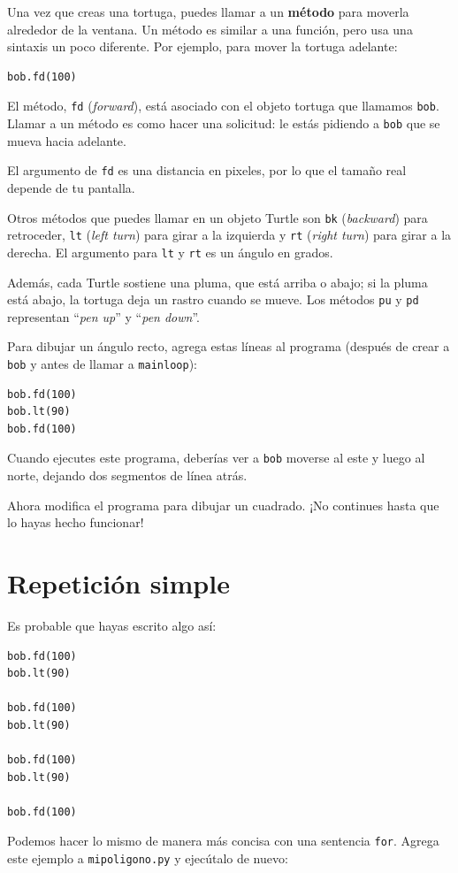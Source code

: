 \documentclass[10pt]{book}
\begin{document}
Una vez que creas una tortuga, puedes llamar a un {\bf método} para moverla
alrededor de la ventana.  Un método es similar a una función, pero
usa una sintaxis un poco diferente.  Por ejemplo, para mover la tortuga
adelante:

\begin{verbatim}
bob.fd(100)
\end{verbatim}
%
El método, {\tt fd} ({\em forward}), está asociado con el objeto
tortuga que llamamos {\tt bob}.
Llamar a un método es como hacer una solicitud: le estás pidiendo a {\tt bob}
que se mueva hacia adelante.

El argumento de {\tt fd} es una distancia en pixeles, por lo que el tamaño
real depende de tu pantalla.

Otros métodos que puedes llamar en un objeto Turtle son {\tt bk} ({\em backward}) para
retroceder, {\tt lt} ({\em left turn}) para girar a la izquierda y {\tt rt} ({\em right turn}) para girar a la derecha.  El
argumento para {\tt lt} y {\tt rt} es un ángulo en grados.

Además, cada Turtle sostiene una pluma, que está
arriba o abajo; si la pluma está abajo, la tortuga deja
un rastro cuando se mueve.  Los métodos {\tt pu} y {\tt pd}
representan ``{\em pen up}'' y ``{\em pen down}''.

Para dibujar un ángulo recto, agrega estas líneas al programa
(después de crear a {\tt bob} y antes de llamar a \verb"mainloop"):

\begin{verbatim}
bob.fd(100)
bob.lt(90)
bob.fd(100)
\end{verbatim}
%
Cuando ejecutes este programa, deberías ver a {\tt bob} moverse al este y luego
al norte, dejando dos segmentos de línea atrás.

Ahora modifica el programa para dibujar un cuadrado.  ¡No continues hasta que
lo hayas hecho funcionar!


\section{Repetición simple}
\label{repetition}

Es probable que hayas escrito algo así:

\begin{verbatim}
bob.fd(100)
bob.lt(90)

bob.fd(100)
bob.lt(90)

bob.fd(100)
bob.lt(90)

bob.fd(100)
\end{verbatim}
%
Podemos hacer lo mismo de manera más concisa con una sentencia {\tt for}.
Agrega este ejemplo a {\tt mipoligono.py} y ejecútalo de nuevo:
\end{document}
